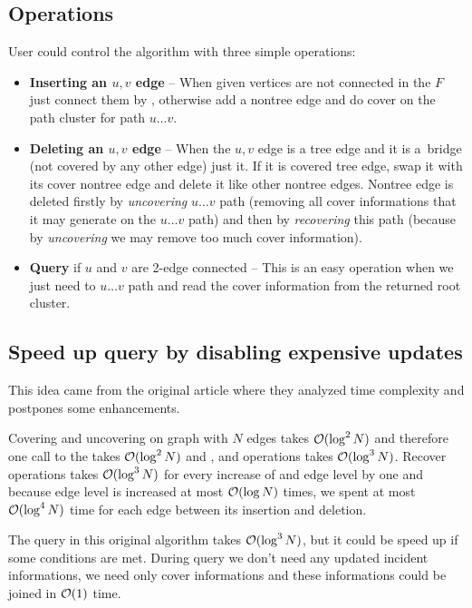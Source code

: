 \subsection{Operations}
User could control the algorithm with three simple operations:

\begin{itemize}
\item {\bf Inserting an $u,v$ edge} -- When given vertices are not connected in
the $F$ just connect them by \Link, otherwise add a nontree edge and do cover on
the path cluster for path $u\dots v$.

\item {\bf Deleting an $u,v$ edge} -- When the $u,v$ edge is a tree edge and it is
a~bridge (not covered by any other edge) just \Cut{} it. If it is covered tree
edge, swap it with its cover nontree edge and delete it like other nontree edges.
Nontree edge is deleted firstly by {\it uncovering} $u\dots v$ path (removing all
cover informations that it may generate on the $u\dots v$ path) and then by
{\it recovering} this path (because by {\it uncovering} we may remove too much
cover information).

\item {\bf Query} if $u$ and $v$ are 2-edge connected -- This is an easy
operation when we just need to \Expose{} $u\dots v$ path and read the cover
information from the returned root cluster.
\end{itemize}

\subsection{Speed up query by disabling expensive updates}

This idea came from the original article \cite{PolylogarithmicAlgorithmsForConnectivity}
where they analyzed time complexity and postpones some enhancements.

Covering and uncovering on graph with $N$ edges takes ${\cal O}(\log^2 N)$ and
therefore one call to the \Join{} takes ${\cal O}(\log^2 N)$ and \Link, \Cut{} and
\Expose{} operations takes ${\cal O}(\log^3 N)$. Recover operations takes ${\cal O}(\log^3
N)$ for every increase of and edge level by one and because edge level is
increased at most ${\cal O}(\log N)$ times, we spent at most ${\cal O}(\log^4 N)$ time for
each edge between its insertion and deletion.

The query in this original algorithm takes ${\cal O}(\log^3 N)$, but it could be speed up
if some conditions are met. During query we don't need any updated incident
informations, we need only cover informations and these informations could be
joined in ${\cal O}(1)$ time.

